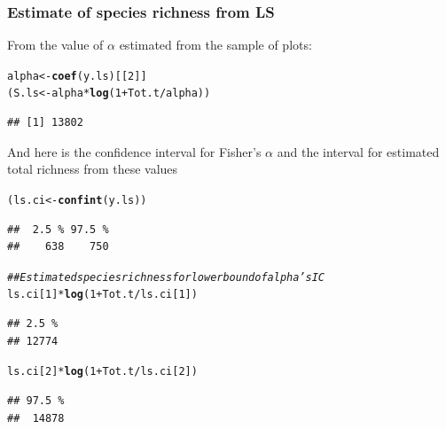 \documentclass[12pt, A4]{article}\usepackage[]{graphicx}\usepackage[]{color}
\makeatletter
\newcommand{\hlnum}[1]{\textcolor[rgb]{0.686,0.059,0.569}{#1}}%
\newcommand{\hlcom}[1]{\textcolor[rgb]{0.678,0.584,0.686}{\textit{#1}}}%
\newcommand{\hlopt}[1]{\textcolor[rgb]{0,0,0}{#1}}%
\newcommand{\hlstd}[1]{\textcolor[rgb]{0.345,0.345,0.345}{#1}}%
\newcommand{\hlkwb}[1]{\textcolor[rgb]{0.69,0.353,0.396}{#1}}%
\newcommand{\hlkwd}[1]{\textcolor[rgb]{0.737,0.353,0.396}{\textbf{#1}}}%
\newenvironment{kframe}{%
 \def\at@end@of@kframe{}%
 \ifinner\ifhmode%
  \def\at@end@of@kframe{\end{minipage}}%
  \begin{minipage}{\columnwidth}%
 \fi\fi%
 \def\FrameCommand##1{\hskip\@totalleftmargin \hskip-\fboxsep
 \colorbox{shadecolor}{##1}\hskip-\fboxsep
     \hskip-\linewidth \hskip-\@totalleftmargin \hskip\columnwidth}%
 \MakeFramed {\advance\hsize-\width
   \@totalleftmargin\z@ \linewidth\hsize
   \@setminipage}}%
 {\par\unskip\endMakeFramed%
 \at@end@of@kframe}
\newenvironment{knitrout}{}{} %
\makeatother
\begin{document}
\subsubsection*{Estimate of species richness from LS}

From the value of $\alpha$ estimated from the sample of plots:
 
\begin{knitrout}
\color{fgcolor}\begin{kframe}
\begin{alltt}
\hlstd{alpha} \hlkwb{<-} \hlkwd{coef}\hlstd{(y.ls)[[}\hlnum{2}\hlstd{]]}
\hlstd{(S.ls} \hlkwb{<-} \hlstd{alpha}\hlopt{*}\hlkwd{log}\hlstd{(}\hlnum{1} \hlopt{+} \hlstd{Tot.t}\hlopt{/}\hlstd{alpha))}
\end{alltt}
\begin{verbatim}
## [1] 13802
\end{verbatim}
\end{kframe}
\end{knitrout}

And here is the confidence interval for Fisher's $\alpha$ and the
interval for estimated total richness from these values

\begin{knitrout}
\color{fgcolor}\begin{kframe}
\begin{alltt}
\hlstd{(ls.ci} \hlkwb{<-} \hlkwd{confint}\hlstd{(y.ls))}
\end{alltt}
\begin{verbatim}
##  2.5 % 97.5 % 
##    638    750
\end{verbatim}
\begin{alltt}
\hlcom{## Estimated species richness for lower bound of alpha's IC}
\hlstd{ls.ci[}\hlnum{1}\hlstd{]}\hlopt{*}\hlkwd{log}\hlstd{(}\hlnum{1} \hlopt{+} \hlstd{Tot.t}\hlopt{/}\hlstd{ls.ci[}\hlnum{1}\hlstd{])}
\end{alltt}
\begin{verbatim}
## 2.5 % 
## 12774
\end{verbatim}
\begin{alltt}
\hlstd{ls.ci[}\hlnum{2}\hlstd{]}\hlopt{*}\hlkwd{log}\hlstd{(}\hlnum{1} \hlopt{+} \hlstd{Tot.t}\hlopt{/}\hlstd{ls.ci[}\hlnum{2}\hlstd{])}
\end{alltt}
\begin{verbatim}
## 97.5 % 
##  14878
\end{verbatim}
\end{kframe}
\end{knitrout}
\end{document}
